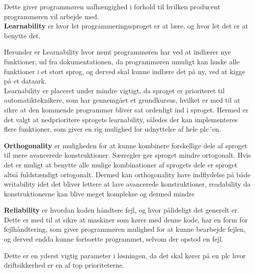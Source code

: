 Dette giver programmøren uafhængighed i forhold til hvilken producent programmøren vil arbejde med.\\

\noindent\textbf{Learnability} er hvor let programmeringssproget er at lære, og hvor let det er at benytte det.

Herunder er Learnability hvor nemt programmøren har ved at indlærer nye funktioner, ud fra dokumentationen, da programmøren umuligt kan huske alle funktioner i et stort sprog, og derved skal kunne indlære det på ny, ved at kigge på et dataark. \\
Learnability er placeret under mindre vigtigt, da sproget er prioriteret til automatikteknikere, som har gennemgået et grundkursus, hvilket er med til at sikre at den kommende programmør bliver sat ordenligt ind i sproget. Hermed er det valgt at nedprioritere sprogets learnability, således der kan implementeres flere funktioner, som giver en rig mulighed for udnyttelse af hele \gls{plc}´en.\\

\noindent\textbf{Orthogonality} er muligheden for at kunne kombinere forskellige dele af sproget til mere avancerede konstruktioner. Særregler gør sproget mindre ortogonalt. Hvis det er muligt at benytte alle mulige kombinationer af sprogets dele er sproget altså fuldstændigt ortogonalt. Dermed kan orthogonality have indflydelse på både writability idet det bliver lettere at lave avancerede konstruktioner, readability da konstruktionerne kan blive meget komplekse og dermed mindre \\

\noindent\textbf{Reliability} er hvordan koden håndtere fejl, og hvor pålideligt det generelt er. Dette er med til at sikre at maskiner som kører med denne kode, har en form for fejlhåndtering, som giver programmøren mulighed for at kunne bearbejde fejlen, og derved endda kunne fortsætte programmet, selvom der opstod en fejl.

Dette er en yderst vigtig parameter i løsningen, da det skal kører på en \gls{plc} hvor driftsikkerhed er en af top prioriteterne.\\


